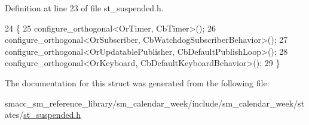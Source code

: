 Definition at line 23 of file st\+\_\+suspended.\+h.


\begin{DoxyCode}
24     \{
25         configure\_orthogonal<OrTimer, CbTimer>();   
26         configure\_orthogonal<OrSubscriber, CbWatchdogSubscriberBehavior>();
27         configure\_orthogonal<OrUpdatablePublisher, CbDefaultPublishLoop>();
28         configure\_orthogonal<OrKeyboard, CbDefaultKeyboardBehavior>();
29     \}
\end{DoxyCode}


The documentation for this struct was generated from the following file\+:\begin{DoxyCompactItemize}
\item 
smacc\+\_\+sm\+\_\+reference\+\_\+library/sm\+\_\+calendar\+\_\+week/include/sm\+\_\+calendar\+\_\+week/states/\hyperlink{sm__calendar__week_2include_2sm__calendar__week_2states_2st__suspended_8h}{st\+\_\+suspended.\+h}\end{DoxyCompactItemize}
